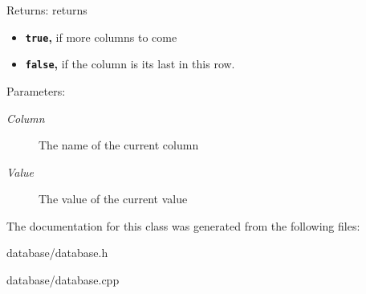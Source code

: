 \begin{Desc}
\item[Returns:]returns\begin{itemize}
\item {\bf {\tt true},} if more columns to come\item {\bf {\tt false},} if the column is its last in this row. \end{itemize}
\end{Desc}
\begin{Desc}
\item[Parameters:]
\begin{description}
\item[{\em Column}]The name of the current column \item[{\em Value}]The value of the current value \end{description}
\end{Desc}


The documentation for this class was generated from the following files:\begin{CompactItemize}
\item 
database/database.h\item 
database/database.cpp\end{CompactItemize}
